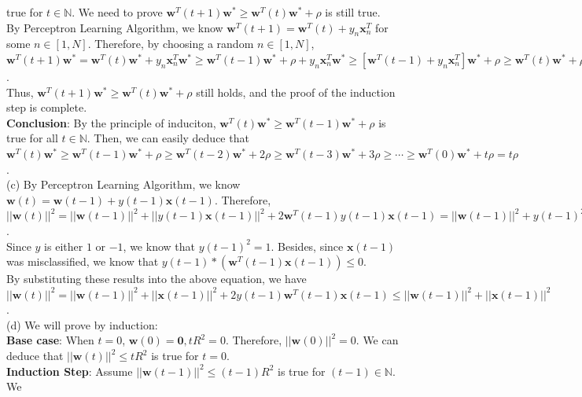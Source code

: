 \documentclass{article}
\begin{document}
    true for $t \in \mathbb{N}$. We need to prove 
    $\mathbf{w}^T(t+1)\mathbf{w^*} \geq \mathbf{w}^T(t)\mathbf{w^*} + \rho$ is still true.\\
    By Perceptron Learning Algorithm, we know $\mathbf{w}^T(t+1) = \mathbf{w}^T(t) + y_n\mathbf{x}_n^T$ for 
    some $n \in [1, N]$. Therefore, by choosing a random $n \in [1, N]$, 
    $\mathbf{w}^T(t+1)\mathbf{w^*} = \mathbf{w}^T(t) \mathbf{w^*} + y_n\mathbf{x}_n^T \mathbf{w^*} \geq
    \mathbf{w}^T(t-1) \mathbf{w^*} + \rho +  y_n\mathbf{x}_n^T \mathbf{w^*} \geq
    [\mathbf{w}^T(t-1) + y_n\mathbf{x}_n^T] \mathbf{w^*} + \rho \geq
    \mathbf{w}^T(t)\mathbf{w^*} + \rho$.\\
    Thus, $\mathbf{w}^T(t+1)\mathbf{w^*} \geq \mathbf{w}^T(t)\mathbf{w^*} + \rho$ still holds, and the proof of 
    the induction step is complete.\\
    \textbf{Conclusion}: By the principle of induciton, 
    $\mathbf{w}^T(t)\mathbf{w^*} \geq \mathbf{w}^T(t-1)\mathbf{w^*} + \rho$ is true for all $t \in \mathbb{N}$.
    Then, we can easily deduce that $\mathbf{w}^T(t)\mathbf{w^*} \geq \mathbf{w}^T(t-1)\mathbf{w^*} + \rho \geq
    \mathbf{w}^T(t-2)\mathbf{w^*} + 2\rho \geq \mathbf{w}^T(t-3)\mathbf{w^*} + 3\rho \geq \cdots \geq 
    \mathbf{w}^T(0)\mathbf{w^*} + t\rho = t\rho$.\\
    (c) By Perceptron Learning Algorithm, we know $\mathbf{w}(t) = \mathbf{w}(t-1) + y(t-1)\mathbf{x}(t-1)$. 
    Therefore, $||\mathbf{w}(t)||^2 = ||\mathbf{w}(t-1)||^2 + ||y(t-1)\mathbf{x}(t-1)||^2 + 
    2\mathbf{w}^T(t-1)y(t-1)\mathbf{x}(t-1) = 
    ||\mathbf{w}(t-1)||^2 + y(t-1)^2||\mathbf{x}(t-1)||^2 + 2y(t-1)\mathbf{w}^T(t-1)\mathbf{x}(t-1)$.\\
    Since $y$ is either $1$ or $-1$, we know that $y(t-1)^2 = 1$. Besides, since $\mathbf{x}(t-1)$ was 
    misclassified, we know that $y(t-1)*(\mathbf{w}^T(t-1)\mathbf{x}(t-1)) \leq 0$.\\
    By substituting these results into the above equation, we have $||\mathbf{w}(t)||^2 = 
    ||\mathbf{w}(t-1)||^2 + ||\mathbf{x}(t-1)||^2 + 2y(t-1)\mathbf{w}^T(t-1)\mathbf{x}(t-1) \leq
    ||\mathbf{w}(t-1)||^2 + ||\mathbf{x}(t-1)||^2$.\\
    (d) We will prove by induction:\\
    \textbf{Base case}: When $t = 0$, $\mathbf{w}(0) = \mathbf{0}, tR^2 = 0$. Therefore, 
    $||\mathbf{w}(0)||^2 = 0$. We can deduce that $||\mathbf{w}(t)||^2 \leq tR^2$ is true for $t = 0$.\\
    \textbf{Induction Step}: Assume $||\mathbf{w}(t-1)||^2 \leq (t-1)R^2$ is true for $(t-1) \in \mathbb{N}$. We 
\end{document}
